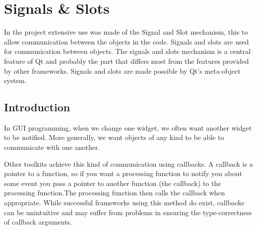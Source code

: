 %
\section{Signals \& Slots}
\label{ref:soft-signal-slot}
In the project extensive use was made of the Signal and Slot mechanism, this to
allow communication between the objects in the code. Signals and slots are used
for communication between objects. The signals and slots mechanism is a central
feature of Qt and probably the part that differs most from the features provided
by other frameworks. Signals and slots are made possible by Qt's meta-object
system.\cite{Qt:signal-slot}

\subsection{Introduction}
\label{ssec:soft-intro}
In GUI programming, when we change one widget, we often want another widget to
be notified. More generally, we want objects of any kind to be able to
communicate with one another.

Other toolkits achieve this kind of communication using callbacks. A callback is
a pointer to a function, so if you want a processing function to notify you
about some event you pass a pointer to another function (the callback) to the
processing function.\linebreak The processing function then calls the callback when
appropriate. While successful frameworks using this method do exist, callbacks
can be unintuitive and may suffer from problems in ensuring the type-correctness
of callback arguments.\cite{Qt:signal-slot}

